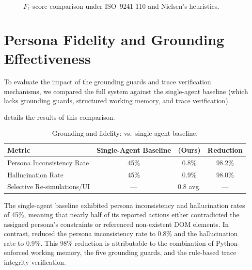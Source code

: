 \begin{figure}[ht]
  \centering
  \caption{$F_1$-score comparison under ISO~9241-110 and Nielsen's heuristics.}
  \label{fig:precision-recall-comparison}
\end{figure}


\section{Persona Fidelity and Grounding Effectiveness}
\label{sec:rq2-results}

To evaluate the impact of the grounding guards and trace verification mechanisms, we compared the full system against the single-agent baseline (which lacks grounding guards, structured working memory, and trace verification).

 details the results of this comparison.

\begin{table}[htbp]
  \centering
  \caption{Grounding and fidelity: \versimux{} vs.\ single-agent baseline.}
  \label{tab:ablation-results}
  \begin{tabularx}{\textwidth}{@{}l c c c@{}}
    \toprule
    \textbf{Metric} & \textbf{Single-Agent Baseline} & \textbf{\versimux{} (Ours)} & \textbf{Reduction} \\
    \midrule
    Persona Inconsistency Rate   & 45\%       & 0.8\%      & 98.2\% \\
    Hallucination Rate           & 45\%       & 0.9\%      & 98.0\% \\
    Selective Re-simulations/UI  & ---        & 0.8 avg.   & --- \\
    \bottomrule
  \end{tabularx}
\end{table}

The single-agent baseline exhibited persona inconsistency and hallucination rates of 45\%, meaning that nearly half of its reported actions either contradicted the assigned persona's constraints or referenced non-existent DOM elements. In contrast, \versimux{} reduced the persona inconsistency rate to 0.8\% and the hallucination rate to 0.9\%. This 98\% reduction is attributable to the combination of Python-enforced working memory, the five grounding guards, and the rule-based trace integrity verification.

